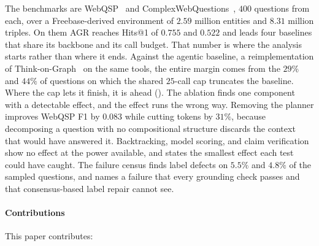 The benchmarks are WebQSP~\cite{yih2016value} and
ComplexWebQuestions~\cite{talmor2018web}, $400$ questions from each,
over a Freebase-derived environment of $2.59$ million entities and
$8.31$ million triples. On them AGR reaches Hits@1 of $0.755$ and
$0.522$ and leads four baselines that share its backbone and its call
budget. That number is where the analysis starts rather than where it
ends. Against the agentic baseline, a reimplementation of
Think-on-Graph~\cite{sun2024think} on the same tools, the entire margin
comes from the $29\%$ and $44\%$ of questions on which the shared
$25$-call cap truncates the baseline. Where the cap lets it finish, it
is ahead (). The ablation finds one component with a
detectable effect, and the effect runs the wrong way. Removing the
planner improves WebQSP F1 by $0.083$ while cutting tokens by $31\%$,
because decomposing a question with no compositional structure discards
the context that would have answered it. Backtracking, model scoring,
and claim verification show no effect at the power available, and
 states the smallest effect each test could have caught.
The failure census finds label defects on $5.5\%$ and $4.8\%$ of the
sampled questions, and names a failure that every grounding check passes
and that consensus-based label repair cannot see.

\paragraph{Contributions} This paper contributes:


